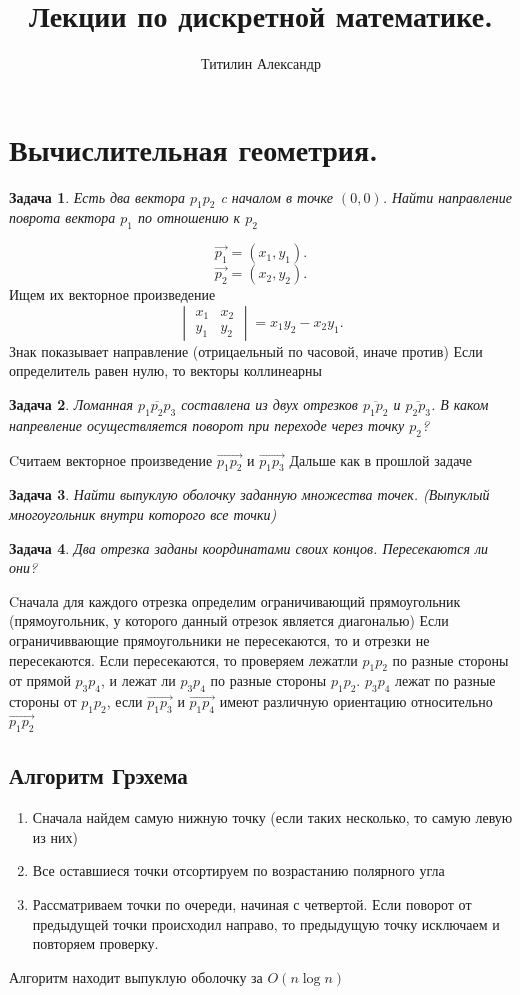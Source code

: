 \documentclass{scrartcl}
\title{Лекции по дискретной математике.}
\author{Титилин Александр}
\date{}
\newtheorem{task}{Задача}
\begin{document}
\maketitle
\section{Вычислительная геометрия.}
\begin{task}
    Есть два вектора $p_1 p_2$ c началом в точке $(0,0)$. Найти направление поврота вектора  $p_1$ по отношению к $p_2$ 
\end{task}
\[
\vec{p_1} = (x_1,y_1)
.\] 
\[
\vec{p_2} = (x_2,y_2)
.\] 
Ищем их векторное произведение
\[
    \begin{vmatrix}
        x_1 & x_2\\
        y_1 & y_2
    \end{vmatrix}  = x_1y_2 - x_2y_1
.\] 
Знак показывает направление (отрицаельный по часовой, иначе против)
Если определитель равен нулю, то векторы коллинеарны
\begin{task}
    Ломанная $\overline{p_1p_2p_3}$ составлена из двух отрезков $\overline{p_1p_2}$ и $\overline{p_2p_3}$. В каком напревление осуществляется поворот
    при переходе через точку $p_2$?
\end{task}
Cчитаем векторное произведение $\vec{p_1p_2}$ и $\vec{p_1p_3}$
Дальше как в прошлой задаче
\begin{task}
	Найти выпуклую оболочку заданную множества точек. (Выпуклый многоугольник внутри которого все точки)
\end{task}
\begin{task}
    Два отрезка заданы координатами своих концов. Пересекаются ли они?
\end{task}
Cначала для каждого отрезка определим ограничивающий прямоугольник (прямоугольник, у которого данный отрезок является диагональю)
Если ограничиввающие прямоугольники не пересекаются, то и отрезки не пересекаются.
Если пересекаются, то проверяем лежатли $p_1 p_2$ по разные стороны от прямой $p_3p_4$, и лежат ли $p_3 p_4$ по разные стороны $p_1p_2$. $p_3 p_4$ лежат по разные стороны от $p_1p_2$, если 
$\vec{p_1p_3}$ и $\vec{p_1p_4}$ имеют различную ориентацию относительно $\vec{p_1p_2}$
\subsection{Алгоритм Грэхема}
\begin{enumerate}
	\item Сначала найдем самую нижную точку (если таких несколько, то самую левую из них)
	\item Все оставшиеся точки отсортируем по возрастанию полярного угла
	\item Рассматриваем точки по очереди, начиная с четвертой. Если поворот от предыдущей точки происходил направо, то предыдущую точку исключаем и повторяем проверку.
\end{enumerate}
Алгоритм находит выпуклую оболочку за $O(n \log{n})$
\end{document}
